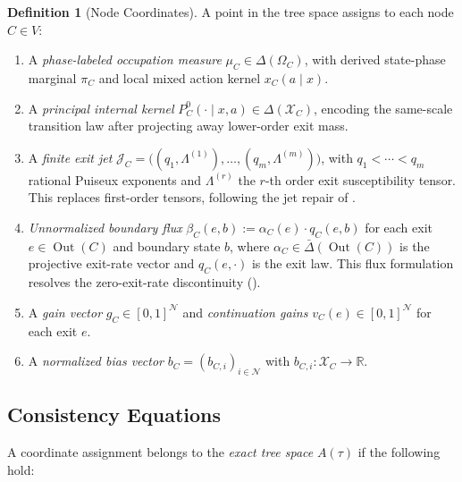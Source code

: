 \documentclass[12pt,a4paper]{article}
\theoremstyle{definition}
\newtheorem{definition}[theorem]{Definition}
\newcommand{\R}{\mathbb{R}}
\newcommand{\cN}{\mathcal{N}}
\newcommand{\cX}{\mathcal{X}}
\newcommand{\cJ}{\mathcal{J}}
\DeclareMathOperator{\Out}{Out}
\begin{document}
\begin{definition}[Node Coordinates]
\label{def:node-coords}
A point in the tree space assigns to each node $C \in V$:
\begin{enumerate}[label=(\roman*)]
\item A \emph{phase-labeled occupation measure} $\mu_C \in \Delta(\Omega_C)$, with derived state-phase marginal $\pi_C$ and local mixed action kernel $x_C(a \mid x)$.
\item A \emph{principal internal kernel} $P_C^0(\cdot \mid x, a) \in \Delta(\cX_C)$, encoding the same-scale transition law after projecting away lower-order exit mass.
\item A \emph{finite exit jet} $\cJ_C = \bigl((q_1, \Lambda^{(1)}), \ldots, (q_m, \Lambda^{(m)})\bigr)$, with $q_1 < \cdots < q_m$ rational Puiseux exponents and $\Lambda^{(r)}$ the $r$-th order exit susceptibility tensor. This replaces first-order tensors, following the jet repair of .
\item \emph{Unnormalized boundary flux} $\beta_C(e, b) := \alpha_C(e) \cdot q_C(e, b)$ for each exit $e \in \Out(C)$ and boundary state $b$, where $\alpha_C \in \bar\Delta(\Out(C))$ is the projective exit-rate vector and $q_C(e, \cdot)$ is the exit law. This flux formulation resolves the zero-exit-rate discontinuity ().
\item A \emph{gain vector} $g_C \in [0,1]^{\cN}$ and \emph{continuation gains} $v_C(e) \in [0,1]^{\cN}$ for each exit $e$.
\item A \emph{normalized bias vector} $b_C = (b_{C,i})_{i \in \cN}$ with $b_{C,i} \colon \cX_C \to \R$.
\end{enumerate}
\end{definition}

\subsection{Consistency Equations}
\label{sec:consistency}

A coordinate assignment belongs to the \emph{exact tree space} $A(\tau)$ if the following hold:
\end{document}
